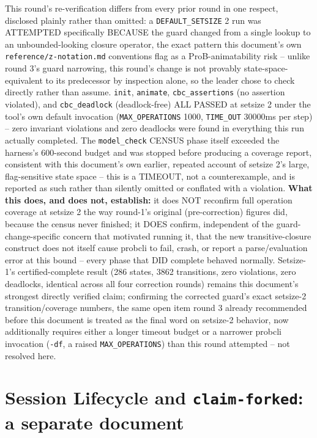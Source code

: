 \documentclass[a4paper,10pt,fleqn]{article}
\newcommand{\fpath}[1]{\texttt{#1}}
\newcommand{\field}[1]{\texttt{#1}}
\begin{document}
This round's re-verification differs from every prior round in one
respect, disclosed plainly rather than omitted: a \field{DEFAULT\_SETSIZE}
2 run was ATTEMPTED specifically BECAUSE the guard changed from a
single lookup to an unbounded-looking closure operator, the exact
pattern this document's own \fpath{reference/z-notation.md} conventions
flag as a ProB-animatability risk -- unlike round 3's guard narrowing,
this round's change is not provably state-space-equivalent to its
predecessor by inspection alone, so the leader chose to check directly
rather than assume. \texttt{init}, \texttt{animate}, \field{cbc\_assertions}
(no assertion violated), and \field{cbc\_deadlock} (deadlock-free) ALL
PASSED at setsize 2 under the tool's own default invocation
(\field{MAX\_OPERATIONS} 1000, \field{TIME\_OUT} 30000ms per step) --
zero invariant violations and zero deadlocks were found in everything
this run actually completed. The \field{model\_check} CENSUS phase
itself exceeded the harness's 600-second budget and was stopped before
producing a coverage report, consistent with this document's own
earlier, repeated account of setsize 2's large, flag-sensitive state
space -- this is a TIMEOUT, not a counterexample, and is reported as
such rather than silently omitted or conflated with a violation.
\textbf{What this does, and does not, establish:} it does NOT
reconfirm full operation coverage at setsize 2 the way round-1's
original (pre-correction) figures did, because the census never
finished; it DOES confirm, independent of the guard-change-specific
concern that motivated running it, that the new transitive-closure
construct does not itself cause probcli to fail, crash, or report a
parse/evaluation error at this bound -- every phase that DID complete
behaved normally. Setsize-1's certified-complete result (286 states,
3862 transitions, zero violations, zero deadlocks, identical across
all four correction rounds) remains this document's strongest directly
verified claim; confirming the corrected guard's exact setsize-2
transition/coverage numbers, the same open item round 3 already
recommended before this document is treated as the final word on
setsize-2 behavior, now additionally requires either a longer timeout
budget or a narrower probcli invocation (\texttt{-df}, a raised
\field{MAX\_OPERATIONS}) than this round attempted -- not resolved
here.

\section{Session Lifecycle and \texttt{claim-forked}: a separate document}
\label{sec:lifecycle}
\end{document}
